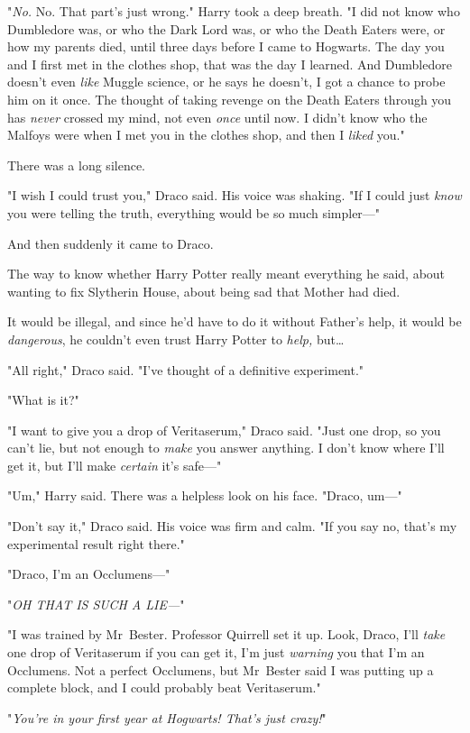 "\emph{No.} No. That part’s just wrong." Harry took a deep breath. "I did not
know who Dumbledore was, or who the Dark Lord was, or who the Death Eaters
were, or how my parents died, until three days before I came to Hogwarts. The
day you and I first met in the clothes shop, that was the day I learned. And
Dumbledore doesn’t even \emph{like} Muggle science, or he says he doesn’t, I
got a chance to probe him on it once. The thought of taking revenge on the
Death Eaters through you has \emph{never} crossed my mind, not even \emph{once}
until now. I didn’t know who the Malfoys were when I met you in the clothes
shop, and then I \emph{liked} you."

There was a long silence.

"I wish I could trust you," Draco said. His voice was shaking. "If I could just
\emph{know} you were telling the truth, everything would be so much simpler—"

And then suddenly it came to Draco.

The way to know whether Harry Potter really meant everything he said, about
wanting to fix Slytherin House, about being sad that Mother had died.

It would be illegal, and since he’d have to do it without Father’s help, it
would be \emph{dangerous}, he couldn’t even trust Harry Potter to \emph{help,}
but…

"All right," Draco said. "I’ve thought of a definitive experiment."

"What is it?"

"I want to give you a drop of Veritaserum," Draco said. "Just one drop, so you
can’t lie, but not enough to \emph{make} you answer anything. I don’t know
where I’ll get it, but I’ll make \emph{certain} it’s safe—"

"Um," Harry said. There was a helpless look on his face. "Draco, um—"

"Don’t say it," Draco said. His voice was firm and calm. "If you say no, that’s
my experimental result right there."

"Draco, I’m an Occlumens—"

"\emph{OH THAT IS SUCH A LIE—}"

"I was trained by Mr~Bester. Professor Quirrell set it up. Look, Draco, I’ll
\emph{take} one drop of Veritaserum if you can get it, I’m just \emph{warning}
you that I’m an Occlumens. Not a perfect Occlumens, but Mr~Bester said I was
putting up a complete block, and I could probably beat Veritaserum."

"\emph{You’re in your first year at Hogwarts! That’s just crazy!}"

